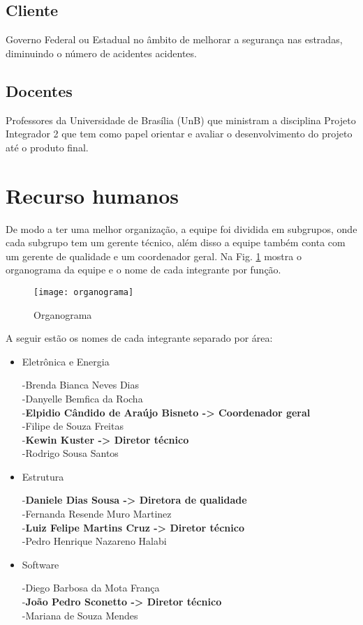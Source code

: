 \subsection {Cliente}

Governo Federal ou Estadual no âmbito de melhorar a segurança nas estradas, diminuindo o número de acidentes acidentes. 

\subsection {Docentes}

Professores da Universidade de Brasília (UnB) que ministram a disciplina Projeto Integrador 2 que tem como papel orientar e avaliar o desenvolvimento do projeto até o produto final.

\section{Recurso humanos}

 De modo a ter uma melhor organização, a equipe foi dividida em subgrupos, onde cada subgrupo tem um gerente técnico, além disso a equipe também conta com um gerente de qualidade e um coordenador geral. Na Fig. \ref{fig:organograma} mostra o organograma da equipe e o nome de cada integrante por função.
 
\begin{figure}[h]
\centering
\texttt{[image: organograma]}
\caption{Organograma}\label{fig:organograma}
\end{figure} 

A seguir estão os nomes de cada integrante separado por área:

\begin{itemize}
\item Eletrônica e Energia

-Brenda Bianca Neves Dias\\
-Danyelle Bemfica da Rocha\\
-\textbf{Elpidio Cândido de Araújo Bisneto -> Coordenador geral}\\
-Filipe de Souza Freitas\\
-\textbf{Kewin Kuster -> Diretor técnico}\\
-Rodrigo Sousa Santos

\item Estrutura

-\textbf{Daniele Dias Sousa -> Diretora de qualidade}\\
-Fernanda Resende Muro Martinez\\
-\textbf{Luiz Felipe Martins Cruz -> Diretor técnico}\\
-Pedro Henrique Nazareno Halabi\\

\item Software

-Diego Barbosa da Mota França\\
-\textbf{João Pedro Sconetto -> Diretor técnico}\\
-Mariana de Souza Mendes 


\end{itemize}

